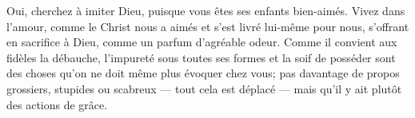 Oui, cherchez à imiter Dieu, puisque vous êtes ses enfants bien-aimés.
Vivez dans l’amour, comme le Christ nous a aimés et s’est livré lui-même pour nous,
	s’offrant en sacrifice à Dieu, comme un parfum d’agréable odeur.
Comme il convient aux fidèles
	la débauche, l’impureté sous toutes ses formes et la soif de posséder
	sont des choses qu’on ne doit même plus évoquer chez vous;
	pas davantage de propos grossiers, stupides ou scabreux
	--- tout cela est déplacé ---
	mais qu’il y ait plutôt des actions de grâce.
